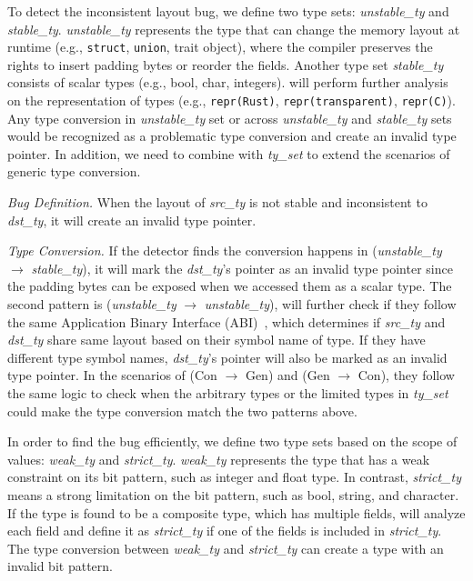 \vspace{0.05in}
To detect the inconsistent layout bug, we define two type sets: \textit{unstable\_ty} and \textit{stable\_ty}. 
\textit{unstable\_ty} represents the type that can change the memory layout at runtime (e.g., \texttt{struct}, \texttt{union}, trait object), where the compiler preserves the rights to insert padding bytes or reorder the fields. Another type set \textit{stable\_ty} consists of scalar types (e.g., bool, char, integers). \Bdtwo will perform further analysis on the representation of types (e.g., \texttt{repr(Rust)}, \texttt{repr(transparent)}, \texttt{repr(C)}). 
Any type conversion in \textit{unstable\_ty} set or across \textit{unstable\_ty} and \textit{stable\_ty} sets would be recognized as a problematic type conversion and create an invalid type pointer. In addition, we need to combine with \textit{ty\_set} to extend the scenarios of generic type conversion.



\noindent\emph{Bug Definition.}
When the layout of \textit{src\_ty} is not stable and inconsistent to \textit{dst\_ty}, it will create an invalid type pointer. 

\noindent\emph{Type Conversion.} 
If the detector finds the conversion happens in (\textit{unstable\_ty} $\rightarrow$ \textit{stable\_ty}), it will mark the \textit{dst\_ty}'s pointer as an invalid type pointer since the padding bytes can be exposed when we accessed them as a scalar type.
The second pattern is (\textit{unstable\_ty} $\rightarrow$ \textit{unstable\_ty}), \bdtwo will further check if they follow the same Application Binary Interface (ABI)~\cite{unsoundcollectiontransmute}, which determines if \textit{src\_ty} and \textit{dst\_ty} share same layout based on their symbol name of type. If they have different type symbol names, \textit{dst\_ty}'s pointer will also be marked as an invalid type pointer.
In the scenarios of (Con $\rightarrow$ Gen) and (Gen $\rightarrow$ Con), they follow the same logic to check when the arbitrary types or the limited types in \textit{ty\_set} could make the type conversion match the two patterns above. 
%


\vspace{0.05in}
In order to find the bug efficiently, we define two type sets based on the scope of values: \textit{weak\_ty} and \textit{strict\_ty}.
\textit{weak\_ty} represents the type that has a weak constraint on its bit pattern, such as integer and float type. In contrast, \textit{strict\_ty} means a strong limitation on the bit pattern, such as bool, string, and character.
If the type is found to be a composite type, which has multiple fields, \bdthree will analyze each field and define it as \textit{strict\_ty} if one of the fields is included in \textit{strict\_ty}.
The type conversion between \textit{weak\_ty} and \textit{strict\_ty} can create a type with an invalid bit pattern.

